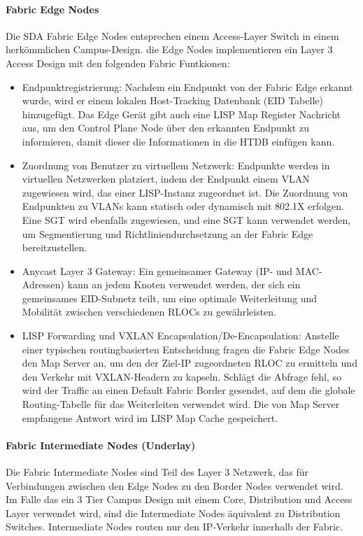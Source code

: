 \paragraph{Fabric Edge Nodes}
Die SDA Fabric Edge Nodes entsprechen einem Access-Layer Switch in einem herkömmlichen Campus-Design. die Edge Nodes implementieren ein Layer 3 Access Design mit den folgenden Fabric Funtkionen: \cite{sda-designguide}
\begin{itemize}	
	\item Endpunktregistrierung: Nachdem ein Endpunkt von der Fabric Edge erkannt wurde, wird er einem lokalen Host-Tracking Datenbank (EID Tabelle) hinzugefügt. Das Edge Gerät gibt auch eine LISP Map Register Nachricht aus, um den Control Plane Node über den erkannten Endpunkt zu informieren, damit dieser die Informationen in die HTDB einfügen kann.
	\item Zuordnung von Benutzer zu virtuellem Netzwerk: Endpunkte werden in virtuellen Netzwerken platziert, indem der Endpunkt einem VLAN zugewiesen wird, das einer LISP-Instanz zugeordnet ist. Die Zuordnung von Endpunkten zu VLANs kann statisch oder dynamisch mit 802.1X erfolgen. Eine SGT wird ebenfalls zugewiesen, und eine SGT kann verwendet werden, um Segmentierung und Richtliniendurchsetzung an der Fabric Edge bereitzustellen.
	\item Anycast Layer 3 Gateway: Ein gemeinsamer Gateway (IP- und MAC-Adressen) kann an jedem Knoten verwendet werden, der sich ein gemeinsames EID-Subnetz teilt, um eine optimale Weiterleitung und Mobilität zwischen verschiedenen RLOCs zu gewährleisten.
	\item LISP Forwarding und VXLAN Encapsulation/De-Encapsulation: Anstelle einer typischen routingbasierten Entscheidung fragen die Fabric Edge Nodes den Map Server an, um den der Ziel-IP zugeordneten RLOC zu ermitteln und den Verkehr mit VXLAN-Headern zu kapseln. Schlägt die Abfrage fehl, so wird der Traffic an einen Default Fabric Border gesendet, auf dem die globale Routing-Tabelle für das Weiterleiten verwendet wird. Die von Map Server empfangene Antwort wird im LISP Map Cache gespeichert. 
\end{itemize} 

\paragraph{Fabric Intermediate Nodes (Underlay)}
Die Fabric Intermediate Nodes sind Teil des Layer 3 Netzwerk, das für Verbindungen zwischen den Edge Nodes zu den Border Nodes verwendet wird. Im Falle das ein 3 Tier Campus Design mit einem Core, Distribution und Access Layer verwendet wird, sind die  Intermediate Nodes äquivalent zu Distribution Switches. Intermediate Nodes routen nur den IP-Verkehr innerhalb der Fabric. \cite{sda-designguide}






